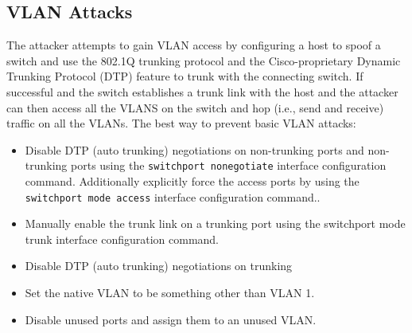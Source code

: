 \subsection{VLAN Attacks}
The attacker attempts to gain VLAN access by configuring a host to spoof a switch and use the 802.1Q trunking protocol and the Cisco-proprietary Dynamic Trunking Protocol (DTP) feature to trunk with the connecting switch. If successful and the switch establishes a trunk link with the host and the attacker can then access all the VLANS on the switch and hop (i.e., send and receive) traffic on all the VLANs. The best way to prevent basic VLAN attacks:
\begin{itemize}
\item Disable DTP (auto trunking) negotiations on non-trunking ports and non-trunking ports using the \texttt{switchport nonegotiate} interface configuration command. Additionally explicitly force the access ports by using the \texttt{switchport mode access} interface configuration command..
\item Manually enable the trunk link on a trunking port using the switchport mode trunk interface configuration command.
\item Disable DTP (auto trunking) negotiations on trunking   
\item Set the native VLAN to be something other than VLAN 1.
\item Disable unused ports and assign them to an unused VLAN.
\end{itemize}
